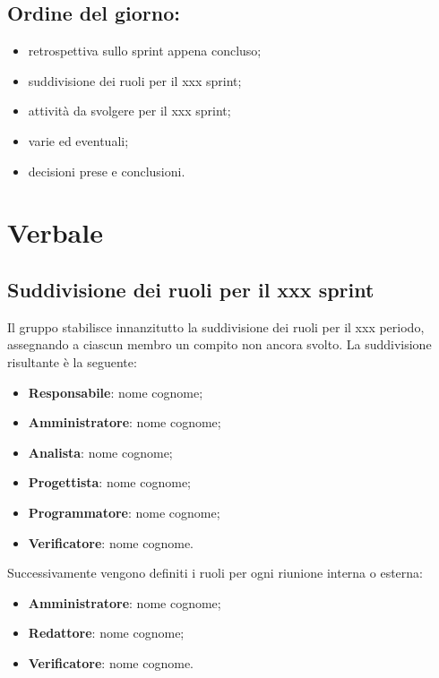 \documentclass[italian,12pt]{article}
\begin{document}
\subsection*{Ordine del giorno:}
\begin{itemize}
	\item retrospettiva sullo sprint appena concluso;
	\item suddivisione dei ruoli per il xxx sprint; %
	\item attività da svolgere per il xxx sprint; %
	\item varie ed eventuali;  %
	\item decisioni prese e conclusioni.
\end{itemize}


\newpage

\section{Verbale}

\subsection{Suddivisione dei ruoli per il xxx sprint} %
Il gruppo stabilisce innanzitutto la suddivisione dei ruoli per il xxx periodo, assegnando a ciascun membro un compito non ancora svolto. La suddivisione risultante è la seguente: %
\begin{itemize}
	\item \textbf{Responsabile}: nome cognome;
	\item \textbf{Amministratore}: nome cognome;
	\item \textbf{Analista}: nome cognome;
	\item \textbf{Progettista}: nome cognome;
	\item \textbf{Programmatore}: nome cognome;
	\item \textbf{Verificatore}: nome cognome.
\end{itemize}
Successivamente vengono definiti i ruoli per ogni riunione interna o esterna:
\begin{itemize}
	\item \textbf{Amministratore}: nome cognome;
	\item \textbf{Redattore}: nome cognome;
	\item \textbf{Verificatore}: nome cognome.
\end{itemize}
\end{document}
